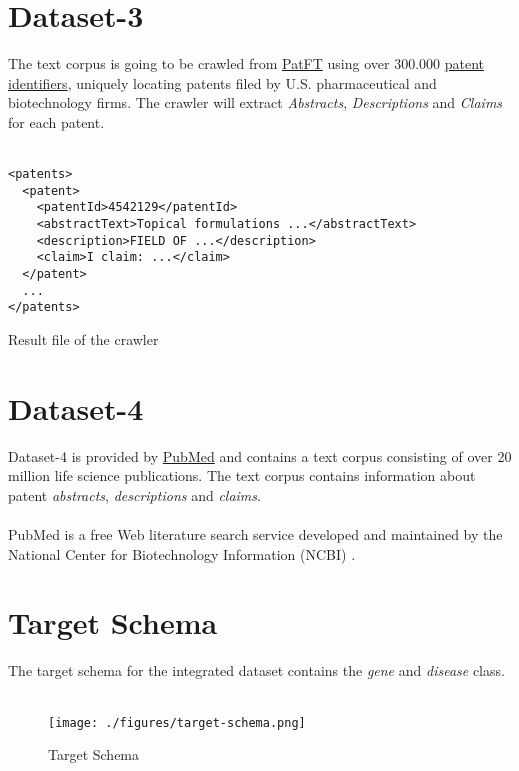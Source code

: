 \documentclass[11pt,titlepage,oneside,openany]{book}
\begin{document}
\section{Dataset-3}
\label{dataset3}
The text corpus is going to be crawled from \href{http://patft.uspto.gov/netahtml/PTO/index.html}{PatFT} using over 300.000 \href{https://nahorgebre.s3.amazonaws.com/US_Patents_1985_2016_313392.csv}{patent identifiers}, uniquely locating patents filed by U.S. pharmaceutical and biotechnology firms. The crawler will extract \textit{Abstracts}, \textit{Descriptions} and \textit{Claims} for each patent.
\\
\\
\begin{lstlisting}
<patents>
  <patent>
    <patentId>4542129</patentId>
    <abstractText>Topical formulations ...</abstractText>
    <description>FIELD OF ...</description>
    <claim>I claim: ...</claim>
  </patent>
  ...
</patents>
\end{lstlisting}
\caption{Result file of the crawler}

\section{Dataset-4}
\label{dataset4}
Dataset-4 is provided by \href{https://www.ncbi.nlm.nih.gov/pubmed/}{PubMed} and contains a text corpus consisting of over 20 million life science publications. The text corpus contains information about patent \textit{abstracts}, \textit{descriptions} and \textit{claims}. 
\\
\\
PubMed is a free Web literature search service developed and maintained by the National Center for Biotechnology Information (NCBI) \cite{Lu2011PubMedAB}.

\section{Target Schema}
\label{target-schema}
The target schema for the integrated dataset contains the \textit{gene} and \textit{disease} class.
\\
\\
\begin{figure}
	\begin{center}
	\texttt{[image: ./figures/target-schema.png]}
	\caption[Target Schema]{Target Schema}
	\label{fig:target-schema}
	\end{center}
\end{figure}	
\end{document}
